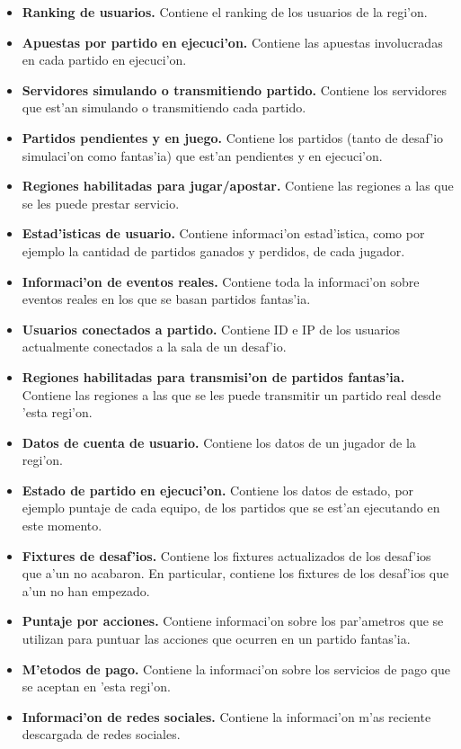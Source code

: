\begin{itemize}
	\item \textbf{Ranking de usuarios.} Contiene el ranking de los usuarios de la regi'on.
	\item \textbf{Apuestas por partido en ejecuci'on.} Contiene las apuestas involucradas en cada partido en ejecuci'on.
	\item \textbf{Servidores simulando o transmitiendo partido.} Contiene los servidores que est'an simulando o transmitiendo cada partido.
	\item \textbf{Partidos pendientes y en juego.} Contiene los partidos (tanto de desaf'io simulaci'on como fantas'ia) que est'an pendientes y en ejecuci'on.
	\item \textbf{Regiones habilitadas para jugar/apostar.} Contiene las regiones a las que se les puede prestar servicio.
	\item \textbf{Estad'isticas de usuario.} Contiene informaci'on estad'istica, como por ejemplo la cantidad de partidos ganados y perdidos, de cada jugador.
	\item \textbf{Informaci'on de eventos reales.} Contiene toda la informaci'on sobre eventos reales en los que se basan partidos fantas'ia.
	\item \textbf{Usuarios conectados a partido.} Contiene ID e IP de los usuarios actualmente conectados a la sala de un desaf'io.
	\item \textbf{Regiones habilitadas para transmisi'on de partidos fantas'ia.} Contiene las regiones a las que se les puede transmitir un partido real desde 'esta regi'on.
	\item \textbf{Datos de cuenta de usuario.} Contiene los datos de un jugador de la regi'on.
	\item \textbf{Estado de partido en ejecuci'on.} Contiene los datos de estado, por ejemplo puntaje de cada equipo, de los partidos que se est'an ejecutando en este momento.
	\item \textbf{Fixtures de desaf'ios.} Contiene los fixtures actualizados de los desaf'ios que a'un no acabaron. En particular, contiene los fixtures de los desaf'ios que a'un no han empezado.
	\item \textbf{Puntaje por acciones.} Contiene informaci'on sobre los par'ametros que se utilizan para puntuar las acciones que ocurren en un partido fantas'ia.
	\item \textbf{M'etodos de pago.} Contiene la informaci'on sobre los servicios de pago que se aceptan en 'esta regi'on.
	\item \textbf{Informaci'on de redes sociales.} Contiene la informaci'on m'as reciente descargada de redes sociales.

\end{itemize}
